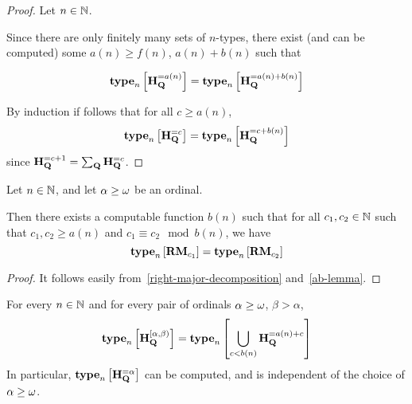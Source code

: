\begin{proof}
    Let $n \in \mathbb{N}$.

    Since there are only finitely many sets of $n$-types,
    there exist (and can be computed)
    some $a(n) \ge f(n)$, $a(n) + b(n)$ such that

    \[
        \mathbf{type}_{n} \left[ {\mathbf{H}_{\mathbf{Q}}^{= a(n)}} \right] = \mathbf{type}_{n} \left[ {\mathbf{H}_{\mathbf{Q}}^{= a(n) + b(n)}} \right]
    \]

    By induction if follows that for all $c \ge a(n)$,
    \[\mathbf{type}_{n} \left[ {\mathbf{H}_{\mathbf{Q}}^{= c}} \right] = \mathbf{type}_{n} \left[ {\mathbf{H}_{\mathbf{Q}}^{= c + b(n)}} \right]\]
    since $\mathbf{H}_{\mathbf{Q}}^{= c + 1} = \sum_{\mathbf{Q}} \mathbf{H}_{\mathbf{Q}}^{= c}$.
\end{proof}

\begin{corollary}\label{s-alpha-finite}
    Let $n \in \mathbb{N}$, and let $\alpha \ge \omega$ be an ordinal.

    Then there exists a computable function $b(n)$ such that
    for all $c_1, c_2 \in \mathbb{N}$ such that $c_1, c_2 \ge a(n)$ and $c_1 \equiv c_2 \mod b(n)$,
    we have
    \[\mathbf{type}_{n} \left[ {\mathbf{RM}_{c_1}} \right] = \mathbf{type}_{n} \left[ {\mathbf{RM}_{c_2}} \right]\]
\end{corollary}

\begin{proof}
    It follows easily from~\cref{right-major-decomposition} and~\cref{ab-lemma}.
\end{proof}

\begin{lemma}
    For every $n \in \mathbb{N}$ and for every pair of ordinals $\alpha \ge \omega$,
    $\beta > \alpha$,
    \[
        \mathbf{type}_{n} \left[ {\mathbf{H}_{\mathbf{Q}}^{[\alpha, \beta)}} \right] = \mathbf{type}_{n} \left[ {\bigcup_{c < b(n)}{\mathbf{H}_{\mathbf{Q}}^{= a(n) + c}}} \right]
    \]
    In particular, $\mathbf{type}_{n} \left[ {\mathbf{H}_{\mathbf{Q}}^{= \alpha}} \right]$ can be computed,
    and is independent of the choice of $\alpha \ge \omega$.
\end{lemma}

